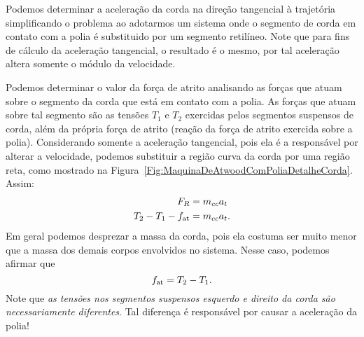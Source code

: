 \begin{marginfigure}
\centering
{}
\caption{Podemos determinar a aceleração da corda na direção tangencial à trajetória simplificando o problema ao adotarmos um sistema onde o segmento de corda em contato com a polia é substituido por um segmento retilíneo. Note que para fins de cálculo da aceleração tangencial, o resultado é o mesmo, por tal aceleração altera somente o módulo da velocidade. \label{Fig:MaquinaDeAtwoodComPoliaDetalheCorda}}
\end{marginfigure}

Podemos determinar o valor da força de atrito analisando as forças que atuam sobre o segmento da corda que está em contato com a polia. As forças que atuam sobre tal segmento são as tensões $T_1$ e $T_2$ exercidas pelos segmentos suspensos de corda, além da própria força de atrito (reação da força de atrito exercida sobre a polia). Considerando somente a aceleração tangencial, pois ela é a responsável por alterar a velocidade, podemos substituir a região curva da corda por uma região reta, como mostrado na Figura~\ref{Fig:MaquinaDeAtwoodComPoliaDetalheCorda}. Assim:
\begin{align}
    F_R &= m_{cc} a_t \\
    T_2 - T_1 - f_{\rm{at}} &= m_{cc} a_t.
\end{align}
%
Em geral podemos desprezar a massa da corda, pois ela costuma ser muito menor que a massa dos demais corpos envolvidos no sistema. Nesse caso, podemos afirmar que
\begin{equation}
    f_{\rm{at}} = T_2 - T_1.
\end{equation}
%
Note que \emph{as tensões nos segmentos suspensos esquerdo e direito da corda são necessariamente diferentes}. Tal diferença é responsável por causar a aceleração da polia! 

